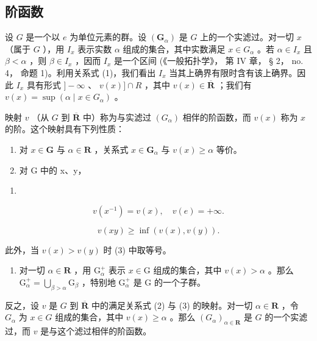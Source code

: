 \subsection{阶函数}

设 \(G\) 是一个以 \(e\) 为单位元素的群。设 \((\mathbf{G}_{\alpha})\) 是 \(G\) 上的一个实滤过。对一切 \(x\) （属于 \(G\) ），用 \(I_x\) 表示实数 \(\alpha\) 组成的集合，其中实数满足 \(x \in G_{\alpha}\) 。若 \(\alpha \in I_x\) 且 \(\beta < \alpha\) ，则 \(\beta \in I_x\) ，因而 \(I_x\) 是一个区间 (《一般拓扑学》， 第 IV 章， § 2， no. 4， 命题 1)。利用关系式 (1)，我们看出 \(I_x\) 当其上确界有限时含有该上确界。因此 \(I_x\) 具有形式 \(] - \infty\) 、 \(v(x)] \cap R\) ，其中 \(v(x) \in \overline{\mathbf{R}}\) ；我们有 \(v(x) = \sup(\alpha \mid x \in G_{\alpha})\) 。

映射 \(v\) （从 \(G\) 到 \(\overline{\mathbf{R}}\) 中）称为与实滤过 \((G_{\alpha})\) 相伴的阶函数，而 \(v(x)\) 称为 \(x\) 的阶。这个映射具有下列性质：

\begin{enumerate}
\def\labelenumi{(\alph{enumi})}
\item
  对 \(x \in \mathbf{G}\) 与 \(\alpha \in \mathbf{R}\) ，关系式 \(x \in \mathbf{G}_{\alpha}\) 与 \(v(x) \geqslant \alpha\) 等价。
\item
  对 G 中的 x、y，
\end{enumerate}

\begin{enumerate}
\def\labelenumi{(\arabic{enumi})}
\setcounter{enumi}{1}
\tightlist
\item
\end{enumerate}

\[
v (x ^ {- 1}) = v (x), \quad v (e) = + \infty .\tag{2}
\]

\[
v (x y) \geqslant \inf (v (x), v (y)).\tag{3}
\]

此外，当 \(v(x) > v(y)\) 时 (3) 中取等号。

\begin{enumerate}
\def\labelenumi{(\alph{enumi})}
\setcounter{enumi}{2}
\tightlist
\item
  对一切 \(\alpha \in \mathbf{R}\) ，用 \(\mathrm{G}_{\alpha}^{+}\) 表示 \(x \in \mathrm{G}\) 组成的集合，其中 \(v(x) > \alpha\) 。那么 \(\mathrm{G}_{\alpha}^{+} = \bigcup_{\beta > \alpha} \mathrm{G}_{\beta}\) ，特别地 \(\mathrm{G}_{\alpha}^{+}\) 是 \(\mathrm{G}\) 的一个子群。
\end{enumerate}

反之，设 \(v\) 是 \(G\) 到 \(\overline{\mathbf{R}}\) 中的满足关系式 (2) 与 (3) 的映射。对一切 \(\alpha \in \mathbf{R}\) ，令 \(G_{\alpha}\) 为 \(x \in G\) 组成的集合，其中 \(v(x) \geqslant \alpha\) 。那么 \((G_{\alpha})_{\alpha \in \mathbf{R}}\) 是 \(G\) 的一个实滤过，而 \(v\) 是与这个滤过相伴的阶函数。

